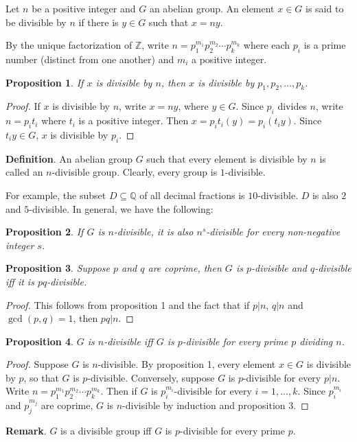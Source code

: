 \documentclass[12pt]{article}
\newtheorem{prop}{Proposition}
\begin{document}
Let $n$ be a positive integer and $G$ an abelian group.  An element $x\in G$ is said to be divisible by $n$ if there is $y\in G$ such that $x=ny$.

By the unique factorization of $\mathbb{Z}$, write $n=p_1^{m_1}p_2^{m_2}\cdots p_k^{m_k}$ where each $p_i$ is a prime number (distinct from one another) and $m_i$ a positive integer.
\begin{prop} If $x$ is divisible by $n$, then $x$ is divisible by $p_1,p_2,\ldots,p_k$. \end{prop}
\begin{proof}
If $x$ is divisible by $n$, write $x=ny$, where $y\in G$.  Since $p_i$ divides $n$, write $n=p_it_i$ where $t_i$ is a positive integer.  Then $x=p_it_i(y)=p_i(t_iy)$.  Since $t_iy\in G$, $x$ is divisible by $p_i$.
\end{proof}

\textbf{Definition}.  An abelian group $G$ such that every element is divisible by $n$ is called an $n$-divisible group.  Clearly, every group is $1$-divisible.

For example, the subset $D\subseteq \mathbb{Q}$ of all decimal fractions is $10$-divisible.  $D$ is also $2$ and $5$-divisible.  In general, we have the following:
\begin{prop} If $G$ is $n$-divisible, it is also $n^s$-divisible for every non-negative integer $s$. \end{prop}
\begin{prop} Suppose $p$ and $q$ are coprime, then $G$ is $p$-divisible and $q$-divisible iff it is $pq$-divisible.  \end{prop}
\begin{proof} This follows from proposition 1 and the fact that if $p|n$, $q|n$ and $\gcd(p,q)=1$, then $pq|n$. \end{proof}
\begin{prop} $G$ is $n$-divisible iff $G$ is $p$-divisible for every prime $p$ dividing $n$. \end{prop}
\begin{proof}
Suppose $G$ is $n$-divisible.  By proposition 1, every element $x\in G$ is divisible by $p$, so that $G$ is $p$-divisible.  Conversely, suppose $G$ is $p$-divisible for every $p|n$.  Write $n=p_1^{m_1}p_2^{m_2}\cdots p_k^{m_k}$.  Then if $G$ is $p_i^{m_i}$-divisible for every $i=1,\ldots, k$.  Since $p_i^{m_i}$ and $p_j^{m_j}$ are coprime, $G$ is $n$-divisible by induction and proposition 3.
\end{proof}

\textbf{Remark}.  $G$ is a divisible group iff $G$ is $p$-divisible for every prime $p$.
\end{document}
